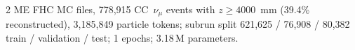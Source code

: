 2 ME FHC MC files, 778{,}915 CC~$\nu_\mu$ events with $z \ge 4000$~mm (39.4\% reconstructed), 3{,}185{,}849 particle tokens; subrun split 621{,}625 / 76{,}908 / 80{,}382 train / validation / test; 1 epochs; 3.18\,M parameters.
